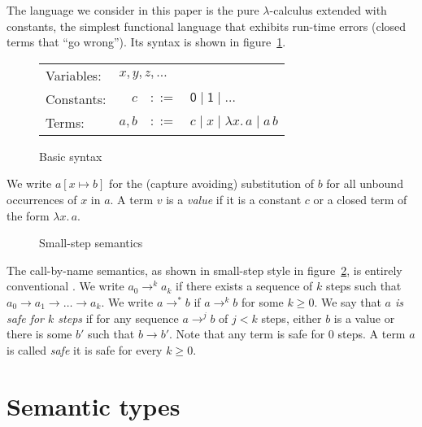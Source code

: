 \documentclass[10pt,a4paper,final,twocolumn]{article}
\theoremstyle{definition}
\theoremstyle{plain}
\newcommand{\abstr}[2]{\ensuremath{\lambda{#1}.\,{#2}}}
\newcommand{\app}[2]{\ensuremath{{#1}\,{#2}}}
\begin{document}
The language we consider in this paper is the pure $\lambda$-calculus extended with constants,
the simplest functional language that exhibits run-time errors (closed terms that ``go wrong'').
Its syntax is shown in figure~\ref{fig:Basic_syntax}.
\begin{figure}[htb]
  \centering
  \begin{tabular}{lrcl}
    Variables: & \multicolumn{3}{l}{$x,y,z,\ldots$} \\
    Constants: & $c$ & $::=$ & $\mathsf{0} \mid \mathsf{1} \mid \ldots$ \\
    Terms: & $a,b$ & $::=$ & $c \mid x \mid \abstr{x}{a} \mid \app{a}{b}$
  \end{tabular}
  \caption{Basic syntax}
  \label{fig:Basic_syntax}
\end{figure}
We write $a[x \mapsto b]$ for the (capture avoiding) substitution of $b$ for all unbound occurrences
of $x$ in $a$. A term $v$ is a \emph{value} if it is a constant $c$ or a closed term of the form
$\abstr{x}{a}$.
\begin{figure}[htb]
  \centering
  \caption{Small-step semantics}
  \label{fig:Small_step_semantics}
\end{figure}
The call-by-name semantics, as shown in small-step style in figure~\ref{fig:Small_step_semantics}, is entirely
conventional \cite{Pierce02}. We write $a_0 \to^k a_k$ if there exists a sequence of $k$ steps such that
$a_0 \to a_1 \to \ldots \to a_k$. We write $a \to^* b$ if $a \to^k b$ for some $k \ge 0$. We say that
\emph{$a$ is safe for $k$ steps} if for any sequence $a \to^j b$ of $j < k$ steps, either $b$ is a value
or there is some $b'$ such that $b \to b'$. Note that any term is safe for $0$ steps. A term $a$ is called
\emph{safe} it is safe for every $k \ge 0$.


\section{Semantic types}
\label{sec:Semantic_types}
\end{document}
